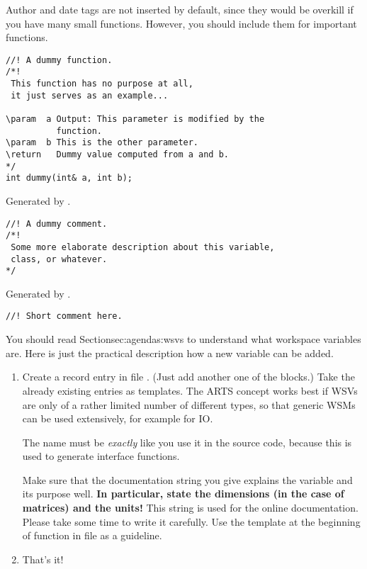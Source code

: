 Author and date tags are not inserted by default, since they would be
overkill if you have many small functions. However, you should include
them for important functions. 

\begin{verbatim}
//! A dummy function.
/*! 
 This function has no purpose at all,
 it just serves as an example... 

\param  a Output: This parameter is modified by the
          function.
\param  b This is the other parameter.         
\return   Dummy value computed from a and b.         
*/
int dummy(int& a, int b);
\end{verbatim}


Generated by .

\begin{verbatim}
//! A dummy comment.
/*! 
 Some more elaborate description about this variable, 
 class, or whatever. 
*/
\end{verbatim}


Generated by .

\begin{verbatim}
//! Short comment here.
\end{verbatim}


 \label{sec:development:extending}


You should read Section{sec:agendas:wsvs} to understand what workspace
variables are. Here is just the practical description how a new
variable can be added.

\begin{enumerate}
\item Create a record entry in file . (Just add
  another one of the  blocks.) Take the
  already existing entries as templates. The ARTS concept works best
  if WSVs are only of a rather limited number of different types, so
  that generic WSMs can be used extensively, for example for IO.
      
  The name must be \emph{exactly} like you use it in the source code,
  because this is used to generate interface functions.
  
  Make sure that the documentation string you give explains the
  variable and its purpose well. \textbf{In particular, state the
    dimensions (in the case of matrices) and the units!} This string
  is used for the online documentation. Please take some time to write
  it carefully. Use the template at the beginning of function
   in file  as a
  guideline. 

\item That's it!
\end{enumerate}


